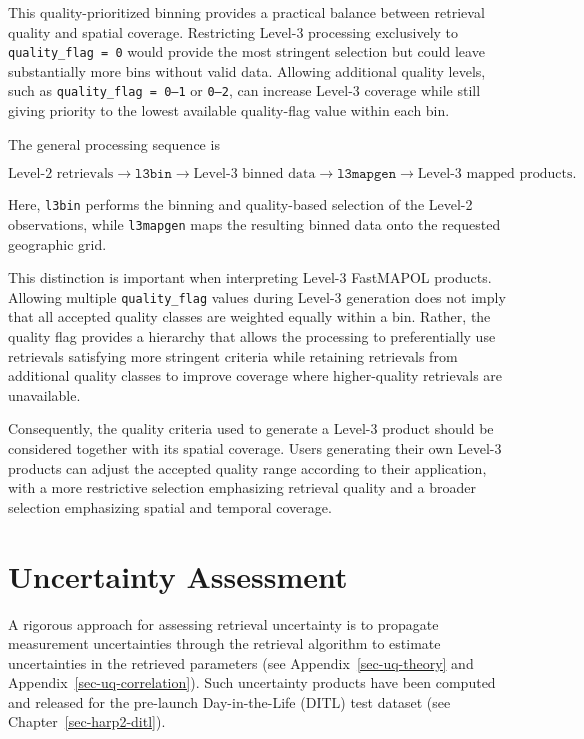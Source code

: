 \documentclass[
  11pt,
  letterpaper,
]{scrreprt}
\begin{document}
This quality-prioritized binning provides a practical balance between
retrieval quality and spatial coverage. Restricting Level-3 processing
exclusively to \texttt{quality\_flag\ =\ 0} would provide the most
stringent selection but could leave substantially more bins without
valid data. Allowing additional quality levels, such as
\texttt{quality\_flag\ =\ 0–1} or \texttt{0–2}, can increase Level-3
coverage while still giving priority to the lowest available
quality-flag value within each bin.

The general processing sequence is

\[
\text{Level-2 retrievals}
\rightarrow
\texttt{l3bin}
\rightarrow
\text{Level-3 binned data}
\rightarrow
\texttt{l3mapgen}
\rightarrow
\text{Level-3 mapped products}.
\]

Here, \texttt{l3bin} performs the binning and quality-based selection of
the Level-2 observations, while \texttt{l3mapgen} maps the resulting
binned data onto the requested geographic grid.

This distinction is important when interpreting Level-3 FastMAPOL
products. Allowing multiple \texttt{quality\_flag} values during Level-3
generation does not imply that all accepted quality classes are weighted
equally within a bin. Rather, the quality flag provides a hierarchy that
allows the processing to preferentially use retrievals satisfying more
stringent criteria while retaining retrievals from additional quality
classes to improve coverage where higher-quality retrievals are
unavailable.

Consequently, the quality criteria used to generate a Level-3 product
should be considered together with its spatial coverage. Users
generating their own Level-3 products can adjust the accepted quality
range according to their application, with a more restrictive selection
emphasizing retrieval quality and a broader selection emphasizing
spatial and temporal coverage.

\section{Uncertainty Assessment}\label{uncertainty-assessment}

A rigorous approach for assessing retrieval uncertainty is to propagate
measurement uncertainties through the retrieval algorithm to estimate
uncertainties in the retrieved parameters (see
Appendix~\ref{sec-uq-theory} and Appendix~\ref{sec-uq-correlation}).
Such uncertainty products have been computed and released for the
pre-launch Day-in-the-Life (DITL) test dataset (see
Chapter~\ref{sec-harp2-ditl}).
\end{document}

